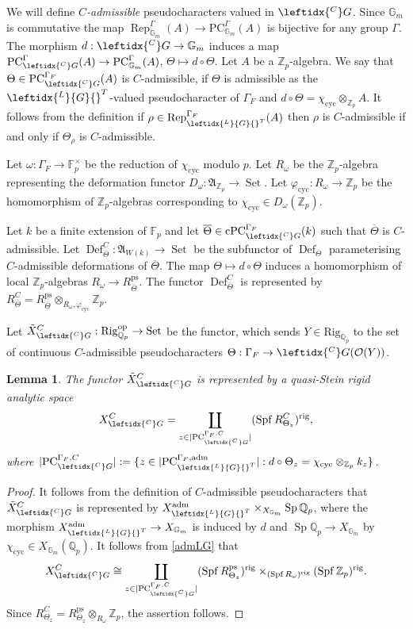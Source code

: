 \documentclass{amsart}
\newtheorem{lem}[prop]{Lemma}
\theoremstyle{definition}
\theoremstyle{remark}
\DeclareMathOperator{\Sp}{Sp}
\DeclareMathOperator{\Rep}{Rep}
\DeclareMathOperator{\Def}{Def}
\DeclareMathOperator{\Set}{Set}
\newcommand{\Qp}{\mathbb {Q}_p}
\newcommand{\Zp}{\ZZ_p}
\newcommand{\ZZ}{\mathbb Z}
\newcommand{\Fp}{\mathbb F_p}
\newcommand{\OO}{\mathcal O}
\newcommand{\adm}{\mathrm{adm}}
\newcommand{\Gm}{\mathbb G_m}
\DeclareMathOperator{\Spf}{Spf}
\newcommand{\rig}{\mathrm{rig}}
\newcommand{\cyc}{\mathrm{cyc}}
\newcommand{\PC}{\mathrm{PC}}
\newcommand{\cPC}{\mathrm{cPC}}
\newcommand{\Thetabar}{\overline{\Theta}}
\newcommand{\ps}{\mathrm{ps}}
\newcommand{\LG}{\leftidx{^L}{G}{}}
\newcommand{\CG}{\leftidx{^C}G{}}
\newcommand{\Rig}{\mathrm{Rig}}
\newcommand{\op}{\mathrm{op}}
\begin{document}
We will define \textit{$C$-admissible} pseudocharacters 
valued in $\CG$. Since $\Gm$ is commutative 
the map $\Rep^{\Gamma}_{\Gm}(A)\rightarrow 
\PC^{\Gamma}_{\Gm}(A)$ is bijective for any group $\Gamma$. The morphism $d: \CG\rightarrow \Gm$ induces a map $\PC^{\Gamma}_{\CG}(A) \rightarrow \PC^{\Gamma}_{\Gm}(A)$, $\Theta\mapsto d\circ \Theta$.
Let $A$ be a $\Zp$-algebra. We say that $\Theta\in \PC^{\Gamma_F}_{\CG{}}(A)$ is $C$-admissible, if $\Theta$ is admissible as 
the $\LG^T$-valued pseudocharacter of $\Gamma_F$ and $d\circ \Theta=\chi_{\cyc}\otimes_{\Zp} A $. It follows from the definition if $\rho\in \Rep^{\Gamma_F}_{\LG^T}(A)$ then $\rho$ is $C$-admissible if and only if 
$\Theta_{\rho}$ is $C$-admissible. 

Let $\omega: \Gamma_F \rightarrow
\Fp^{\times}$ be the reduction of $\chi_{\cyc}$ modulo $p$. Let $R_{\omega}$ be the $\Zp$-algebra 
representing the deformation functor $D_{\omega}: \mathfrak A_{\Zp} \rightarrow \Set$. Let $\varphi_{\cyc}: R_{\omega}\rightarrow \Zp$ be the 
homomorphism of $\Zp$-algebras corresponding 
to $\chi_{\cyc}\in D_{\omega}(\Zp)$. 

Let $k$ be a finite extension of $\Fp$ and let 
$\Thetabar\in \cPC^{\Gamma_F}_{\CG{}}(k)$ such that 
$\Thetabar$ is $C$-admissible. Let $\Def^{C}_{\Thetabar}: \mathfrak A_{W(k)} \rightarrow \Set$ be the subfunctor of $\Def_{\Thetabar}$ parameterising $C$-admissible deformations of $\Thetabar$. The map $\Theta\mapsto d\circ \Theta$ induces a homomorphism 
of local $\Zp$-algebras $R_{\omega}\rightarrow R^{\ps}_{\Thetabar}$. The functor $\Def^{C}_{\Thetabar}$ is represented by 
$R^{C}_{\Thetabar}= R^{\ps}_{\Thetabar}\otimes_{R_{\omega}, \varphi_{\cyc}} \Zp$.

Let $\tilde{X}^C_{\CG{}}: \Rig_{\Qp}^{\op} \rightarrow \Set$ be the functor, which sends
$Y\in \Rig_{\Qp}$ to the set of continuous $C$-admissible pseudocharacters $\Theta: \Gamma_F \rightarrow \CG(\OO(Y))$.

\begin{lem}\label{quasi_Stein_C} The functor $\tilde{X}^{C}_{\CG{}}$ is represented by a quasi-Stein rigid analytic space 
$$ X^{C}_{\CG{}}= \coprod_{z\in |\PC^{\Gamma_F,C}_{\CG{}}|} (\Spf R^{C}_{\Theta_z})^{\rig},$$
where
$|\PC^{\Gamma_F,C}_{\CG{}}|:=\{ z\in|\PC^{\Gamma_F,\adm}_{\LG^T}|: d\circ\Theta_z=\chi_{\cyc}\otimes_{\Zp} k_z\}$. 
\end{lem}
\begin{proof} It follows from the definition of $C$-admissible pseudocharacters that $ \tilde{X}^{C}_{\CG}$ is represented by 
$X^{\adm}_{\LG^T}\times_{X_{\Gm}} \Sp \Qp$, where the morphism $X^{\adm}_{\LG^T}\rightarrow X_{\Gm}$ is induced by $d$ and $\Sp \Qp\rightarrow X_{\Gm}$ by $\chi_{\cyc}\in X_{\Gm}(\Qp)$. It follows from \eqref{admLG} that 
$$ X^C_{\CG}\cong \coprod_{z\in |\PC^{\Gamma_F,C}_{\CG{}}|} (\Spf R^{\ps}_{\Theta_z})^{\rig} \times_{(\Spf R_{\omega})^{\rig}} (\Spf \Zp)^{\rig}.$$ 
Since $R^C_{\Theta_z}= R^{\ps}_{\Theta_z}\otimes_{R_{\omega}} \Zp$, the assertion follows. 
\end{proof}
\end{document}
